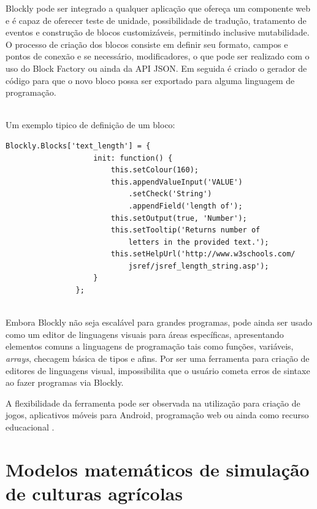 \documentclass[tg]{mdtufsm}
\begin{document}
        	Blockly pode ser integrado a qualquer aplicação que ofereça um componente web e é capaz de oferecer teste de unidade, possibilidade de tradução, tratamento de eventos e construção de blocos customizáveis, permitindo inclusive mutabilidade. O processo de criação dos blocos consiste em definir seu formato, campos e pontos de conexão e se necessário, modificadores, o que pode ser realizado com o uso do Block Factory ou ainda da API JSON.
        	Em seguida é criado o gerador de código para que o novo bloco possa ser exportado para alguma linguagem de programação.

        	~\\
        	Um exemplo tipico de definição de um bloco:
        	\begin{lstlisting}[frame=single]
                Blockly.Blocks['text_length'] = {
                    init: function() {
                        this.setColour(160);
                        this.appendValueInput('VALUE')
                            .setCheck('String')
                            .appendField('length of');
                        this.setOutput(true, 'Number');
                        this.setTooltip('Returns number of
                            letters in the provided text.');
                        this.setHelpUrl('http://www.w3schools.com/
                            jsref/jsref_length_string.asp');
                    }
                };
            \end{lstlisting}
        	~\\

        	Embora Blockly não seja escalável para grandes programas, pode ainda ser usado como um editor de linguagens visuais para áreas específicas, apresentando elementos comuns a linguagens de programação tais como funções, variáveis, \emph{arrays}, checagem básica de tipos e afins. Por ser uma ferramenta para criação de editores de linguagens visual, impossibilita que o usuário cometa erros de sintaxe ao fazer programas via Blockly.

        	A flexibilidade da ferramenta pode ser observada na utilização para criação de jogos, aplicativos móveis para Android, programação web ou ainda como recurso educacional \cite{blocklyGames,blocklymobile,blocklyJavaScript,blocklyEducation}.

    	\section{Modelos matemáticos de simulação de culturas agrícolas}
\end{document}
